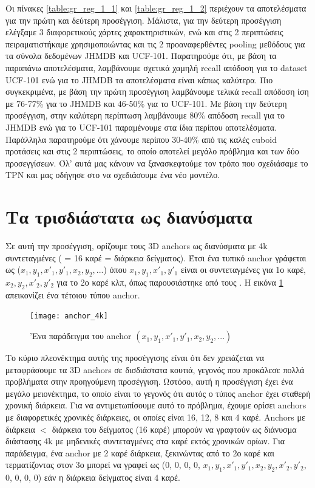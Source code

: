 \gr
Οι πίνακες \ref{table:gr_reg_1_1} και \ref{table:gr_reg_1_2} περιέχουν τα αποτελέσματα για την πρώτη και δεύτερη προσέγγιση. Μάλιστα, για την δεύτερη προσέγγιση ελέγξαμε 3 διαφορετικούς χάρτες
χαρακτηριστικών, ενώ και στις 2 περιπτώσεις πειραματιστήκαμε χρησιμοποιώντας και τις 2 προαναφερθέντες \en pooling \gr μεθόδους για τα σύνολα δεδομένων \en JHMDB \gr και \en UCF-101\gr.
Παρατηρούμε ότι, με βάση τα παραπάνω αποτελέσματα, λαμβάνουμε σχετικά χαμηλή \en recall \gr απόδοση για το \en dataset UCF-101 \gr ενώ για το \en JHMDB \gr  τα αποτελέσματα είναι κάπως καλύτερα.
Πιο συγκεκριμένα, με βάση την πρώτη προσέγγιση λαμβάνουμε τελικά \en recall \gr απόδοση ίση με 76-77\% για το \en JHMDB \gr και 46-50\% για το \en UCF-101\gr. Με βάση την δεύτερη προσέγγιση,
στην καλύτερη περίπτωση λαμβάνουμε 80\% απόδοση \en recall  \gr για το \en JHMDB \gr ενώ για το \en UCF-101 \gr παραμένουμε στα ίδια περίπου αποτελέσματα.
Παράλληλα παρατηρούμε ότι χάνουμε περίπου 30-40\% από τις καλές \en cuboid \gr προτάσεις και στις 2 περιπτώσεις, το οποίο αποτελεί μεγάλο πρόβλημα και των δύο προσεγγίσεων.
Όλ' αυτά μας κάνουν να ξανασκεφτούμε τον τρόπο που σχεδιάσαμε το \en TPN \gr και μας οδήγησε στο να σχεδιάσουμε ένα νέο μοντέλο.


\section{\gr Τα τρισδιάστατα  ως  διανύσματα}
Σε αυτή την προσέγγιση, ορίζουμε τους \en 3D anchors \gr ως διανύσματα με \en 4k \gr συντεταγμένες ( = 16 καρέ = διάρκεια δείγματος).
Έτσι ένα τυπικό \en anchor \gr γράφεται ως ($x_1, y_1, x'_1, y'_1, x_2, y_2, ...$)
όπου $x_1, y_1, x'_1, y'_1 $ είναι οι συντεταγμένες για 1ο καρέ, $x_2, y_2, x'_2, y'_2$ για το 2ο καρέ κλπ, όπως παρουσιάστηκε από τους \en\cite{DBLP:journals/corr/abs-1712-09184}\gr. 
Η εικόνα \ref{fig:gr_anchor_4k} απεικονίζει ένα τέτοιου τύπου \en anchor\gr.

\en
\begin{figure}[h]
  \en
  \centering
  \texttt{[image: anchor\_4k]}
  \caption{\gr 'Ενα παράδειγμα του \en anchor $(x_1,y_1,x'_1,y'_1,x_2,y_2, ...)$}

  \label{fig:gr_anchor_4k}
\end{figure}
\gr

Το κύριο πλεονέκτημα αυτής της προσέγγισης είναι ότι δεν χρειάζεται να μεταφράσουμε τα \en 3D anchors \gr σε δισδιάστατα κουτιά, γεγονός που προκάλεσε πολλά προβλήματα στην προηγούμενη προσέγγιση.
Ωστόσο, αυτή η προσέγγιση έχει ένα μεγάλο μειονέκτημα, το οποίο είναι το γεγονός ότι αυτός ο τύπος \en anchor \gr έχει σταθερή χρονική διάρκεια.
Για να αντιμετωπίσουμε αυτό το πρόβλημα, έχουμε ορίσει \en anchors \gr με διαφορετικές χρονικές διάρκειες, οι οποίες είναι 16, 12, 8 και 4 καρέ.
\en Anchors \gr με διάρκεια $<$  διάρκεια του δείγματος (16 καρέ) μπορούν  να γραφτούν ως διάνυσμα διάστασης \en 4k \gr με μηδενικές συντεταγμένες στα καρέ εκτός χρονικών ορίων.
Για παράδειγμα, ένα \en anchor \gr με 2 καρέ διάρκεια, ξεκινώντας από το 2ο καρέ και τερματίζοντας στον 3ο μπορεί να γραφεί ως
(0, 0, 0, 0, $x_1, y_1, x'_1, y'_1, x_2, y_2, x'_2, y'_2$, 0, 0, 0, 0)  εάν η διάρκεια δείγματος
είναι 4 καρέ. 

